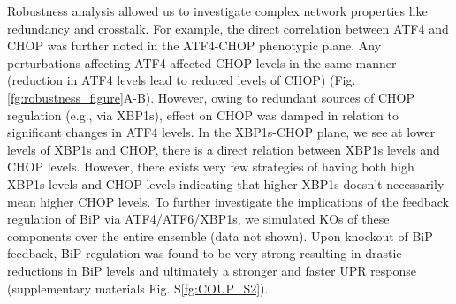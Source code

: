 \documentclass[fleqn,10pt]{wlscirep}
\begin{document}
Robustness analysis allowed us to investigate complex network properties like redundancy and crosstalk. For example, the direct correlation between ATF4 and CHOP was further noted in the ATF4-CHOP phenotypic plane. Any perturbations affecting ATF4 affected CHOP levels in the same manner (reduction in ATF4 levels lead to reduced levels of CHOP) (Fig. \ref{fg:robustness_figure}A-B). However, owing to redundant sources of CHOP regulation (e.g., via XBP1s), effect on CHOP was damped in relation to significant changes in ATF4 levels. In the XBP1s-CHOP plane, we see at lower levels of XBP1s and CHOP, there is a direct relation between XBP1s levels and CHOP levels. However, there exists very few strategies of having both high XBP1s levels and CHOP levels indicating that higher XBP1s doesn't necessarily mean higher CHOP levels. To further investigate the implications of the feedback regulation of BiP via ATF4/ATF6/XBP1s, we simulated KOs of these components over the entire ensemble (data not shown). Upon knockout of BiP feedback, BiP regulation was found to be very strong resulting in drastic reductions in BiP levels and ultimately a stronger and faster UPR response (supplementary materials Fig. S\ref{fg:COUP_S2}).

\iffalse (supplementary materials Fig. S\ref{fg:COUP_S2}). KO of ATF6 and XBP1s mediated feedback of BiP was seen to have little effect (as marked by robustness coefficients for BiP, supplementary materials Fig. S\ref{fg:COUP_S2}). However, ATF4 mediated feedback KO led to significant amount of reduction in BiP levels (supplementary materials Fig. S\ref{fg:COUP_S2}) thereby highlighting the significance of ATF4 in BiP feedback. Upon KO of all branches of BiP feedback, we found overall reductions of BiP levels. However, there were two distinct populations. One with a $\sim$ 10 fold reduction in BiP levels while the other had $\sim$ 1000 fold reduction in BiP levels. These two populations could resemble two distinct operational paradigms within UPR. In the first mode of operation feedback, BiP regulation is really strong resulting in drastic reductions in BiP levels and ultimately a stronger and faster UPR response upon knockout of BiP feedback. 
\fi
\end{document}
